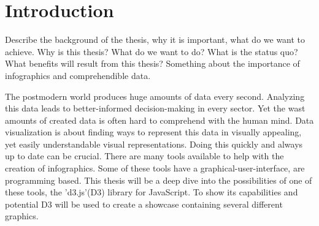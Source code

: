 \chapter{Introduction}
Describe the background of the thesis, why it is important, what do we want to achieve.
Why is this thesis? What do we want to do? What is the status quo? What benefits will result from this thesis?
Something about the importance of infographics and comprehendible data. 


The postmodern world produces huge amounts of data every second. Analyzing this data leads to better-informed decision-making in every sector. Yet the wast amounts of created data is often hard to comprehend with the human mind. Data visualization is about finding ways to represent this data in visually appealing, yet easily understandable visual representations. Doing this quickly and always up to date can be crucial. There are many tools available to help with the creation of infographics. Some of these tools have a graphical-user-interface, are programming based. This thesis will be a deep dive into the possibilities of one of these tools, the 'd3.js'(D3) library for JavaScript. To show its capabilities and potential D3 will be used to create a showcase containing several different graphics.
